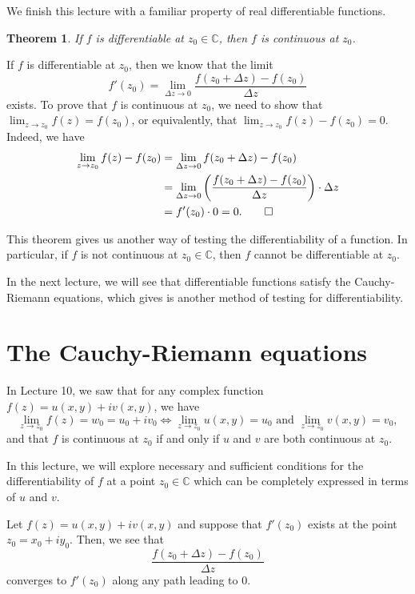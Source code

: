 \documentclass[10pt]{article}
\makeatletter
\newcommand{\C}{\mathbb{C}}
\theoremstyle{newstyle}
\newtheorem{thm}{Theorem}[section]
\newenvironment{pf}[1][\proofname]{\par
  \pushQED{\qed}%
  \normalfont \topsep0\p@\relax
  \trivlist
  \item[\hskip\labelsep\scshape
  #1\@addpunct{.}]\ignorespaces
}{%
  \popQED\endtrivlist\@endpefalse
}
\makeatother
\begin{document}
We finish this lecture with a familiar property of real differentiable functions. 

\begin{thm}
If $f$ is differentiable at $z_0 \in \C$, then $f$ is continuous at $z_0$. 
\end{thm}
\begin{pf}
If $f$ is differentiable at $z_0$, then we know that the limit 
\[ f'(z_0) = \lim_{\Delta z \to 0} \frac{f(z_0 + \Delta z) - f(z_0)}{\Delta z} \]
exists. To prove that $f$ is continuous at $z_0$, we need to show that $\lim_{z\to z_0} 
f(z) = f(z_0)$, or equivalently, that $\lim_{z\to z_0} f(z) - f(z_0) = 0$. Indeed, we have 
\begin{align*}
    \lim_{z\to z_0} f(z) - f(z_0) &= \lim_{\Delta z \to 0} f(z_0 + \Delta z) - f(z_0) \\
    &= \lim_{\Delta z \to 0} \left( \frac{f(z_0 + \Delta z) - f(z_0)}{\Delta z} \right) \cdot \Delta z \\
    &= f'(z_0) \cdot 0 = 0. \qedhere 
\end{align*}
\end{pf}

This theorem gives us another way of testing the differentiability of a function. In particular, 
if $f$ is not continuous at $z_0 \in \C$, then $f$ cannot be differentiable at $z_0$. 

In the next lecture, we will see that differentiable functions satisfy the Cauchy-Riemann equations, 
which gives is another method of testing for differentiability. 

\newpage 
\section{The Cauchy-Riemann equations}

In Lecture 10, we saw that for any complex function $f(z) = u(x, y) + iv(x, y)$, we have 
\[ \lim_{z\to z_0} f(z) = w_0 = u_0 + iv_0 \iff \lim_{z\to z_0} u(x, y) = u_0 \text{ and } 
\lim_{z\to z_0} v(x, y) = v_0, \]
and that $f$ is continuous at $z_0$ if and only if $u$ and $v$ are both continuous at $z_0$. 

In this lecture, we will explore necessary and sufficient conditions for the differentiability 
of $f$ at a point $z_0 \in \C$ which can be completely expressed in terms of $u$ and $v$. 

Let $f(z) = u(x, y) + iv(x, y)$ and suppose that $f'(z_0)$ exists at the point $z_0 = x_0 + iy_0$. 
Then, we see that 
\[ \frac{f(z_0 + \Delta z) - f(z_0)}{\Delta z} \]
converges to $f'(z_0)$ along any path leading to $0$. 
\end{document}
